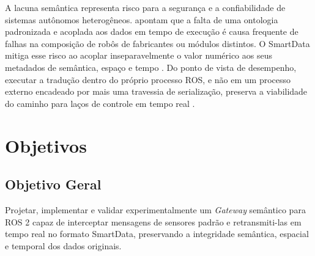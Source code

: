\documentclass[
    12pt,
    oneside,
    a4paper,
    chapter=TITLE,
    section=TITLE,
    english,
    brazil
]{abntex2}
\begin{document}
A lacuna semântica representa risco para a segurança e a confiabilidade de
sistemas autônomos heterogêneos.  apontam
que a falta de uma ontologia padronizada e acoplada aos dados em tempo de
execução é causa frequente de falhas na composição de robôs de fabricantes
ou módulos distintos. O SmartData mitiga esse risco ao acoplar
inseparavelmente o valor numérico aos seus metadados de semântica, espaço e
tempo \cite{frohlich2018smartdata}. Do ponto de vista de desempenho,
executar a tradução dentro do próprio processo ROS, e não em um processo
externo encadeado por mais uma travessia de serialização, preserva a
viabilidade do caminho para laços de controle em tempo real
\cite{kronauer2021latency}.

\section{Objetivos}
\label{sec:objetivos}

\subsection{Objetivo Geral}
Projetar, implementar e validar experimentalmente um \textit{Gateway}
semântico para ROS 2 capaz de interceptar mensagens de sensores padrão e
retransmiti-las em tempo real no formato SmartData, preservando a
integridade semântica, espacial e temporal dos dados originais.
\end{document}
